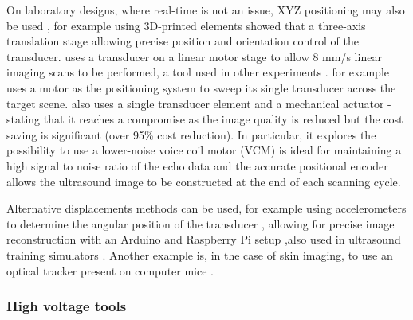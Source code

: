 \documentclass{article}
\begin{document}
On laboratory designs, where real-time is not an issue, XYZ positioning may also be used \cite{svilainis_electronics_2014,wang_high_2019,xu_enabling_2019}, for example using 3D-printed elements \cite{bottenus_feasibility_2016} showed that a three-axis translation stage allowing precise position and orientation control of the transducer. \cite{qiu_programmable_2011} uses a transducer on a linear motor stage to allow 8 mm/s linear imaging scans to be performed, a tool used in other experiments \cite{govindan_reconfigurable_2015,soto-cajiga_fpga-based_2012}.  \cite{heuvel_development_2017} for example uses a motor as the positioning system to sweep its single transducer across the target scene.  \cite{smith_design_2015} also uses a single transducer element and a mechanical actuator - stating that it reaches a compromise as the image quality is reduced but the cost saving is significant (over 95\% cost reduction). In particular, it explores the possibility  to use a lower-noise voice coil motor (VCM) is ideal for maintaining a high signal to noise ratio of the echo data and the accurate positional encoder allows the ultrasound image to be constructed at the end of each scanning cycle.

Alternative displacements methods can be used, for example using accelerometers to determine the angular position of the transducer  \cite{sobhani_portable_2016}, allowing for precise image reconstruction with an Arduino and Raspberry Pi setup \cite{herickhoff_low-cost_2019},also used in ultrasound training simulators \cite{farsoni_low-cost_2017} . Another example is, in the case of skin imaging, to use an optical tracker present on computer mice \cite{zhang_free-hand_2019,poulsen_optical_2005,herickhoff_low-cost_2018}.

\subsubsection{High voltage tools}
\end{document}
